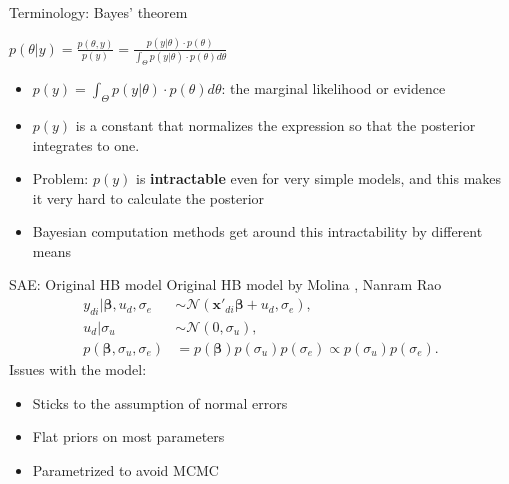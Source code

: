 \begin{frame}{Terminology: Bayes' theorem}
    \begin{center}
        $p(\theta|y) = \displaystyle \frac{p(\theta, y)}{p(y)} = \displaystyle \frac{p(y|\theta) \cdot p(\theta)}{\int_\Theta p(y|\theta) \cdot p(\theta) d\theta}$\\
    \end{center}

    \begin{itemize}

        \item
        $p(y) = \int_\Theta p(y|\theta) \cdot p(\theta) d\theta$: the marginal likelihood or evidence

        \item
        $p(y)$ is a constant that normalizes the expression so that the posterior integrates to one.

        \item
        Problem: $p(y)$ is \textbf{intractable} even for very simple models, and this makes it very hard to calculate the posterior

        \item
        Bayesian computation methods get around this intractability by different means


    \end{itemize}

\end{frame}

\begin{frame}{SAE: Original HB model}
    \vspace{-1cm}
    Original HB model by Molina , Nanram Rao
    \begin{equation*}
        \label{eq:hb_rao}
        \begin{split}
            y_{di} |\boldsymbol \beta, u_d, \sigma_e & \sim \mathcal N(\boldsymbol{x'}_{di} \boldsymbol{\beta}+ u_d, \sigma_e), \\
            u_d | \sigma_u & \sim \mathcal N(0, \sigma_u), \\
            p(\boldsymbol \beta, \sigma_u, \sigma_e) & = p(\boldsymbol \beta) p(\sigma_u)p(\sigma_e) \propto p(\sigma_u)p(\sigma_e).
        \end{split}
    \end{equation*}
    Issues with the model:
    \begin{itemize}
        \item Sticks to the assumption of normal errors
        \item Flat priors on most parameters
        \item Parametrized to avoid MCMC
    \end{itemize}
\end{frame}

